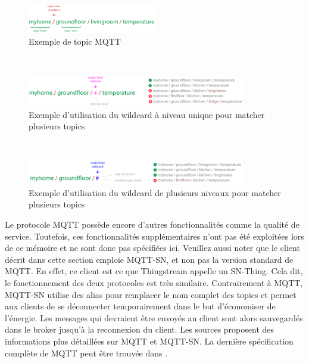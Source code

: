 ~

\begin{figure}[ht!]
  \centering
  \includegraphics[width=0.5\textwidth]{img/app/example_topic.png}
  \caption{Exemple de topic MQTT \cite{mqtt_examples}}
  \label{fig:ex_top}
\end{figure}

~

\begin{figure}[ht!]
  \centering
  \includegraphics[width=0.85\textwidth]{img/app/mqtt_wild1.png}
  \caption{Exemple d'utilisation du wildcard à niveau unique pour matcher plusieurs topics \cite{mqtt_examples}}
  \label{fig:wildmq1}
\end{figure}

~

\begin{figure}[ht!]
  \centering
  \includegraphics[width=0.85\textwidth]{img/app/mqtt_wild2.png}
  \caption{Exemple d'utilisation du wildcard de plusieurs niveaux pour matcher plusieurs topics \cite{mqtt_examples}}
  \label{fig:wildmq2}
\end{figure}


\noindent
Le protocole MQTT possède encore d'autres fonctionnalités comme la qualité de service. Toutefois, ces fonctionnalités supplémentaires n'ont pas été exploitées lors de ce mémoire et ne sont donc pas spécifiées ici. Veuillez aussi noter que le client décrit dans cette section emploie MQTT-SN, et non pas la version standard de MQTT. En effet, ce client est ce que Thingstream appelle un SN-Thing. Cela dit, le fonctionnement des deux protocoles est très similaire. Contrairement à MQTT, MQTT-SN utilise des alias pour remplacer le nom complet des topics et permet aux clients de se déconnecter temporairement dans le but d'économiser de l'énergie. Les messages qui devraient être envoyés au client sont alors sauvegardés dans le broker jusqu'à la reconnexion du client. Les sources proposent des informations plus détaillées sur MQTT et MQTT-SN. La dernière spécification complète de MQTT peut être trouvée dans \cite{banks2019mqtt}.

